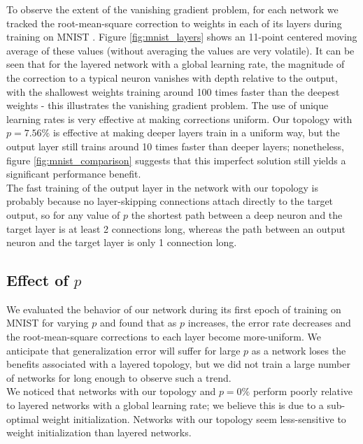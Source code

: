 \documentclass[format=sigconf]{acmart}
\newcommand{\npar}{\\\indent}
\begin{document}
To observe the extent of the vanishing gradient problem, for each network we tracked the root-mean-square correction to weights in each of its layers during training on MNIST \cite{mnist1998}. Figure \ref{fig:mnist_layers} shows an 11-point centered moving average of these values (without averaging the values are very volatile). It can be seen that for the layered network with a global learning rate, the magnitude of the correction to a typical neuron vanishes with depth relative to the output, with the shallowest weights training around 100 times faster than the deepest weights - this illustrates the vanishing gradient problem. The use of unique learning rates is very effective at making corrections uniform. Our topology with $p=7.56\%$ is effective at making deeper layers train in a uniform way, but the output layer still trains around 10 times faster than deeper layers; nonetheless, figure \ref{fig:mnist_comparison} suggests that this imperfect solution still yields a significant performance benefit.
\npar
The fast training of the output layer in the network with our topology is probably because no layer-skipping connections attach directly to the target output, so for any value of $p$ the shortest path between a deep neuron and the target layer is at least 2 connections long, whereas the path between an output neuron and the target layer is only 1 connection long.

\subsection{Effect of $p$}
%
%
We evaluated the behavior of our network during its first epoch of training on MNIST for varying $p$ and found that as $p$ increases, the error rate decreases and the root-mean-square corrections to each layer become more-uniform. We anticipate that generalization error will suffer for large $p$ as a network loses the benefits associated with a layered topology, but we did not train a large number of networks for long enough to observe such a trend. 
\npar
We noticed that networks with our topology and $p=0\%$ perform poorly relative to layered networks with a global learning rate; we believe this is due to a sub-optimal weight initialization. Networks with our topology seem less-sensitive to weight initialization than layered networks.
\end{document}
